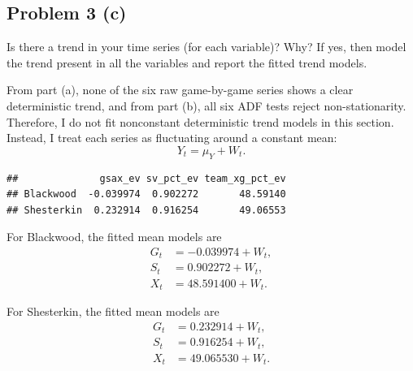 \documentclass[
  10pt,
]{extarticle}
\newenvironment{Shaded}{\begin{snugshade}}{\end{snugshade}}
\newcommand{\AttributeTok}[1]{\textcolor[rgb]{0.13,0.29,0.53}{#1}}
\newcommand{\CommentTok}[1]{\textcolor[rgb]{0.56,0.35,0.01}{\textit{#1}}}
\newcommand{\DecValTok}[1]{\textcolor[rgb]{0.00,0.00,0.81}{#1}}
\newcommand{\FunctionTok}[1]{\textcolor[rgb]{0.13,0.29,0.53}{\textbf{#1}}}
\newcommand{\NormalTok}[1]{#1}
\newcommand{\SpecialCharTok}[1]{\textcolor[rgb]{0.81,0.36,0.00}{\textbf{#1}}}
\newcounter{none} %
\begin{document}
\newpage

\subsection{Problem 3 (c)}\label{problem-3-c}

\begin{problem}[Problem 3 (c)]
Is there a trend in your time series (for each variable)? Why? If yes, then model the trend present in all the variables and report the fitted trend models.
\end{problem}

From part (a), none of the six raw game-by-game series shows a clear deterministic trend, and from part (b), all six ADF tests reject non-stationarity. Therefore, I do not fit nonconstant deterministic trend models in this section. Instead, I treat each series as fluctuating around a constant mean:
\[
Y_t = \mu_Y + W_t.
\]

\begin{Shaded}
\end{Shaded}

\begin{verbatim}
##              gsax_ev sv_pct_ev team_xg_pct_ev
## Blackwood  -0.039974  0.902272       48.59140
## Shesterkin  0.232914  0.916254       49.06553
\end{verbatim}

For Blackwood, the fitted mean models are
\[
\begin{aligned}
G_t &= -0.039974 + W_t,\\
S_t &= 0.902272 + W_t,\\
X_t &= 48.591400 + W_t.
\end{aligned}
\]

For Shesterkin, the fitted mean models are
\[
\begin{aligned}
G_t &= 0.232914 + W_t,\\
S_t &= 0.916254 + W_t,\\
X_t &= 49.065530 + W_t.
\end{aligned}
\]
\end{document}
